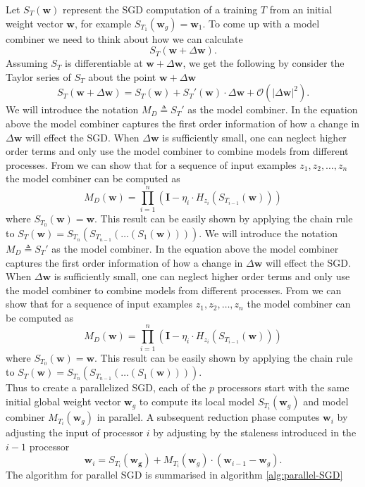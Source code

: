 Let $S_{T} \left( \bm{w} \right)$ represent the SGD computation of a training $T$ from an initial weight vector $\bm{w}$, for example $S_{T_{1}} \left( \bm{w}_{g} \right) = \bm{w}_{1}$. To come up with a model combiner we need to think about how we can calculate
\[
    S_{T} \left( \bm{w} + \Delta \bm{w} \right).
\]
Assuming $S_{T}$ is differentiable at $\bm{w} + \Delta \bm{w}$, we get the following by consider the Taylor series of $S_{T}$ about the point $\bm{w} + \Delta \bm{w}$
\[
    S_{T} \left( \bm{w} + \Delta \bm{w} \right) = S_{T} \left( \bm{w} \right) + S_{T} ' \left( \bm{w} \right) \cdot \Delta \bm{w} + \mathcal{O} \left( \left| \Delta \bm{w} \right|^{2} \right).
\]
We will introduce the notation $M_{D} \triangleq S_{T}'$ as the model combiner. In the equation above the model combiner captures the first order information of how a change in $\Delta \bm{w}$ will effect the SGD. When $\Delta \bm{w}$ is sufficiently small, one can neglect higher order terms and only use the model combiner to combine models from different processes. From \cite{MalekiSaeed2017PSGD} we can show that for a sequence of input examples $z_1 , z_2, \ldots , z_{n}$ the model combiner can be computed as
\[
    M_{D} (\bm{w}) = \prod_{i=1}^{n} \left( \bm{I} - \eta_{i} \cdot H_{z_{i}} \left( S_{T_{i-1}} \left( \bm{w} \right) \right) \right)
\]
where $S_{T_{0}} \left( \bm{w} \right) = \bm{w}$. This result can be easily shown by applying the chain rule to $S_{T} \left( \bm{w} \right) = S_{T_{n}} \left( S_{T_{n-1}} \left( \ldots \left( S_{1} \left( \bm{w} \right) \right) \right) \right)$. We will introduce the notation $M_{D} \triangleq S_{T}'$ as the model combiner. In the equation above the model combiner captures the first order information of how a change in $\Delta \bm{w}$ will effect the SGD. When $\Delta \bm{w}$ is sufficiently small, one can neglect higher order terms and only use the model combiner to combine models from different processes. From \cite{MalekiSaeed2017PSGD} we can show that for a sequence of input examples $z_1 , z_2, \ldots , z_{n}$ the model combiner can be computed as
\[
    M_{D} (\bm{w}) = \prod_{i=1}^{n} \left( \bm{I} - \eta_{i} \cdot H_{z_{i}} \left( S_{T_{i-1}} \left( \bm{w} \right) \right) \right)
\]
where $S_{T_{0}} \left( \bm{w} \right) = \bm{w}$. This result can be easily shown by applying the chain rule to $S_{T} \left( \bm{w} \right) = S_{T_{n}} \left( S_{T_{n-1}} \left( \ldots \left( S_{1} \left( \bm{w} \right) \right) \right) \right)$.\\[1\baselineskip]
Thus to create a parallelized SGD, each of the $p$ processors start with the same initial global weight vector $\bm{w}_{g}$ to compute its local model $S_{T_i} \left( \bm{w}_{g} \right)$ and model combiner $M_{T_{i}} \left( \bm{w}_{g} \right)$ in parallel. A subsequent reduction phase computes $\bm{w}_{i}$ by adjusting the input of processor $i$ by adjusting by the staleness introduced in the $i-1$ processor
\[
    \bm{w}_{i} = S_{T_{i}} \left( \bm{w_{g}} \right) + M_{T_{i}} \left( \bm{w}_{g} \right) \cdot \left( \bm{w}_{i-1} - \bm{w}_{g} \right).
\]
The algorithm for parallel SGD is summarised in algorithm \ref{alg:parallel-SGD}

